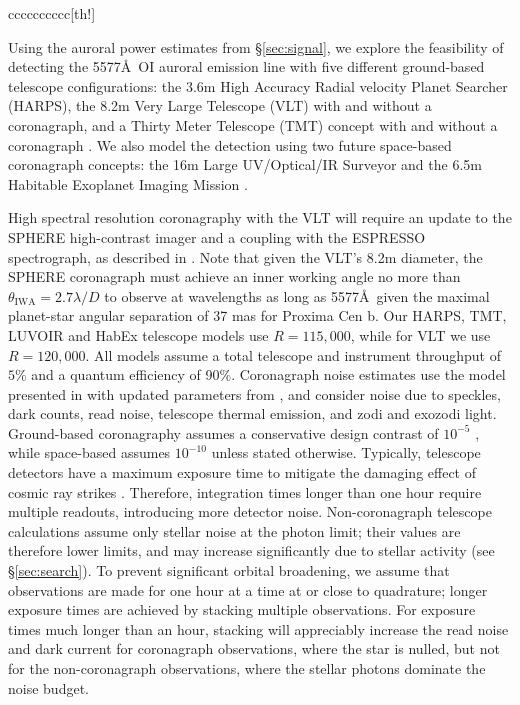 \documentclass{emulateapj}
\begin{document}
\begin{deluxetable*}{cccccccccc}[th!]
\end{deluxetable*}

Using the auroral power estimates from \S\ref{sec:signal}, we explore the feasibility of detecting the 5577\AA\ OI auroral emission line with five different ground-based telescope configurations: the 3.6m High Accuracy Radial velocity Planet Searcher (HARPS), the 8.2m Very Large Telescope (VLT) with and without a coronagraph, and a Thirty Meter Telescope (TMT) concept with and without a coronagraph \citep{Skidmore2015,Udry2014,Johns2012}. We also model the detection using two future space-based coronagraph concepts: the 16m Large UV/Optical/IR Surveyor \citep[LUVOIR;][]{Kouveliotou2014,Dalcanton2015} and the 6.5m Habitable Exoplanet Imaging Mission \citep[HabEx;][]{Mennesson2016}.

High spectral resolution coronagraphy with the VLT will require an update to the SPHERE high-contrast imager and a coupling with the ESPRESSO spectrograph, as described in \citet{Lovis2016}. Note that given the VLT's 8.2m diameter, the SPHERE coronagraph must achieve an inner working angle no more than $\theta_{\text{IWA}} = 2.7 \lambda / D$ to observe at wavelengths as long as 5577\AA\, given the maximal planet-star angular separation of 37 mas for Proxima Cen b. Our HARPS, TMT, LUVOIR and HabEx telescope models use $R = 115,000$, while for VLT we use $R = 120,000$. All models assume a total telescope and instrument throughput of $5\%$ and a quantum efficiency of 90\%. Coronagraph noise estimates use the model presented in \citet{Robinson2016} with updated parameters from \citet{Meadows2016}, and consider noise due to speckles, dark counts, read noise, telescope thermal emission, and zodi and exozodi light. Ground-based coronagraphy assumes a conservative design contrast of $10^{-5}$ \citep{Dou2010,Guyon2012}, while space-based assumes $10^{-10}$ \citep{Meadows2016} unless stated otherwise. Typically, telescope detectors have a maximum exposure time to mitigate the damaging effect of cosmic ray strikes \citep[see][]{Robinson2016}. Therefore, integration times longer than one hour require multiple readouts, introducing more detector noise. Non-coronagraph telescope calculations assume only stellar noise at the photon limit; their values are therefore lower limits, and may increase significantly due to stellar activity (see \S\ref{sec:search}). To prevent significant orbital broadening, we assume that observations are made for one hour at a time at or close to quadrature; longer exposure times are achieved by stacking multiple observations. For exposure times much longer than an hour, stacking will appreciably increase the read noise and dark current for coronagraph observations, where the star is nulled, but not for the non-coronagraph observations, where the stellar photons dominate the noise budget.
\end{document}
